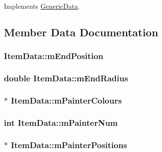 Implements \hyperlink{class_generic_data_a93ea61de5b09cf3fc95564ef3d841214}{Generic\-Data}.



\subsection{Member Data Documentation}
\hypertarget{class_item_data_a33649729ff05366dc714a903eafe7e47}{
\subsubsection[{m\-End\-Position}]{ Item\-Data\-::m\-End\-Position}}\label{class_item_data_a33649729ff05366dc714a903eafe7e47}
\hypertarget{class_item_data_a0ba449b337e0596bd1401d6318cc1b8e}{
\subsubsection[{m\-End\-Radius}]{\setlength{\rightskip}{0pt plus 5cm}double Item\-Data\-::m\-End\-Radius}}\label{class_item_data_a0ba449b337e0596bd1401d6318cc1b8e}
\hypertarget{class_item_data_a96be973680b6a94519f07a7a660fd6f6}{
\subsubsection[{m\-Painter\-Colours}]{$\ast$ Item\-Data\-::m\-Painter\-Colours}}\label{class_item_data_a96be973680b6a94519f07a7a660fd6f6}
\hypertarget{class_item_data_ad34492f2bef4ac472141c8c2f49a4453}{
\subsubsection[{m\-Painter\-Num}]{\setlength{\rightskip}{0pt plus 5cm}int Item\-Data\-::m\-Painter\-Num}}\label{class_item_data_ad34492f2bef4ac472141c8c2f49a4453}
\hypertarget{class_item_data_a143e1354591086a1eccfa88a88142d80}{
\subsubsection[{m\-Painter\-Positions}]{$\ast$ Item\-Data\-::m\-Painter\-Positions}}\label{class_item_data_a143e1354591086a1eccfa88a88142d80}
